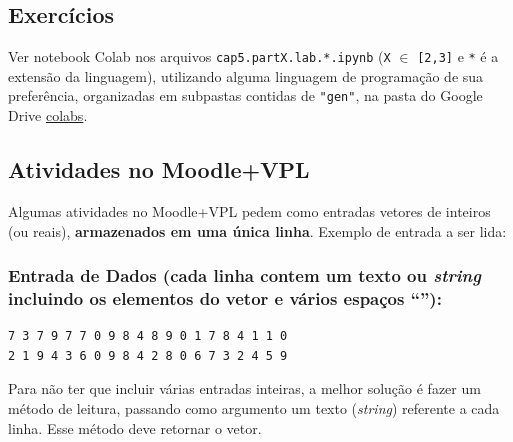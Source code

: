 \documentclass[12pt,a4paper]{article}
\begin{document}
    \hypertarget{exercuxedcios}{%
\subsection{Exercícios}\label{exercuxedcios}}

    Ver notebook Colab nos arquivos \texttt{cap5.partX.lab.*.ipynb}
(\texttt{X} \(\in\) \texttt{{[}2,3{]}} e \texttt{*} é a extensão da
linguagem), utilizando alguma linguagem de programação de sua
preferência, organizadas em subpastas contidas de \texttt{"gen"}, na
pasta do Google Drive
\href{https://drive.google.com/drive/folders/1YlFwv8XYN7PYYf-HwDMlkxzbmXzJw9cM?usp=sharing}{colabs}.

    \hypertarget{atividades-no-moodlevpl}{%
\subsection{Atividades no Moodle+VPL}\label{atividades-no-moodlevpl}}

Algumas atividades no Moodle+VPL pedem como entradas vetores de inteiros
(ou reais), \textbf{armazenados em uma única linha}. Exemplo de entrada
a ser lida:

\hypertarget{entrada-de-dados-cada-linha-contem-um-texto-ou-string-incluindo-os-elementos-do-vetor-e-vuxe1rios-espauxe7os}{%
\subsubsection{\texorpdfstring{Entrada de Dados (cada linha contem um
texto ou \emph{string} incluindo os elementos do vetor e vários espaços
``\texttt{}''):}{Entrada de Dados (cada linha contem um texto ou string incluindo os elementos do vetor e vários espaços ``\,''):}}\label{entrada-de-dados-cada-linha-contem-um-texto-ou-string-incluindo-os-elementos-do-vetor-e-vuxe1rios-espauxe7os}}

\begin{verbatim}
7 3 7 9 7 7 0 9 8 4 8 9 0 1 7 8 4 1 1 0 
2 1 9 4 3 6 0 9 8 4 2 8 0 6 7 3 2 4 5 9
\end{verbatim}

Para não ter que incluir várias entradas inteiras, a melhor solução é
fazer um método de leitura, passando como argumento um texto
(\emph{string}) referente a cada linha. Esse método deve retornar o
vetor.
\end{document}

